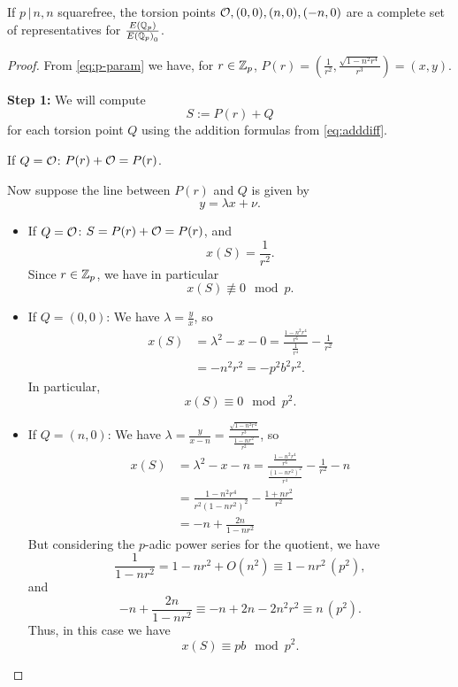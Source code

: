 \documentclass[12pt, a4paper]{amsart}
\begin{document}
\begin{thm}
  If $p \, | \, n, n$ squarefree, the torsion points ${\mathcal O}, (0,0), (n,0), (-n,0)$
  are a complete set of representatives for $\frac{{E({\mathbb Q}_p)}}{{E({\mathbb Q}_p)}_0}$.
\end{thm}
\begin{proof}
  From \autoref{eq:p-param} we have, for $r \in {\mathbb Z}_p$,
  $P(r) = (\frac{1}{r^2}, \frac{\sqrt{1-n^2r^4}}{r^3}) = (x,y)$.

  \textbf{Step 1:} We will compute $$S := P(r) + Q$$ for each torsion point $Q$ using
  the addition formulas from \autoref{eq:adddiff}.
   
  If $Q = {\mathcal O}$: $P(r) + {\mathcal O} = P(r)$.

  Now suppose the line between $P(r)$ and $Q$ is given by
  \[y = \lambda x + \nu.\]

  \begin{itemize}
    
  \item If $Q = {\mathcal O}$: $S = P(r) + {\mathcal O} = P(r)$, and
    \[x(S) = \frac{1}{r^2}.\]
    Since $r \in {\mathbb Z}_p$, we have in particular
    \[x(S) \not\equiv 0 \mod{p}.\]
    
  \item If $Q = (0,0)$:
  We have $\lambda = \frac{y}{x}$, so
  \begin{equation*}
    \begin{split}
      x(S)
      &= \lambda^2 - x - 0 =
      \frac{\frac{1 - n^2r^4}{r^6}}{\frac{1}{r^4}} - \frac{1}{r^2} \\
      &= -n^2r^2 = -p^2b^2r^2.
    \end{split}
  \end{equation*}
  In particular, 
  \[x(S) \equiv 0 \mod{p^2}.\]
  
\item If $Q = (n, 0)$: We have $\lambda = \frac{y}{x-n} =
  \frac{\frac{\sqrt{1-n^2r^4}}{r^3}}{\frac{1-nr^2}{r^2}}$, so
  \begin{equation*}
    \begin{split}
      x(S)
      &= \lambda^2 - x - n = 
      \frac{\frac{1 - n^2r^4}{r^6}}{\frac{(1-nr^2)^2}{r^4}} -
      \frac{1}{r^2} - n \\
      &= \frac{1-n^2r^4}{r^2(1-nr^2)^2} - \frac{1+nr^2}{r^2} \\
      &= -n + \frac{2n}{1-nr^2}
    \end{split}
  \end{equation*}
  But considering the $p$-adic power series for the quotient, we have
  \[\frac{1}{1-nr^2} = 1 - nr^2 + O(n^2) \equiv 1-nr^2 \, (p^2),\] and 
  \[-n + \frac{2n}{1-nr^2} \equiv -n + 2n - 2n^2r^2 \equiv n \, (p^2).\]
  Thus, in this case we have
  \[x(S) \equiv pb \mod{p^2}.\]


\end{itemize}
\end{proof}
\end{document}
